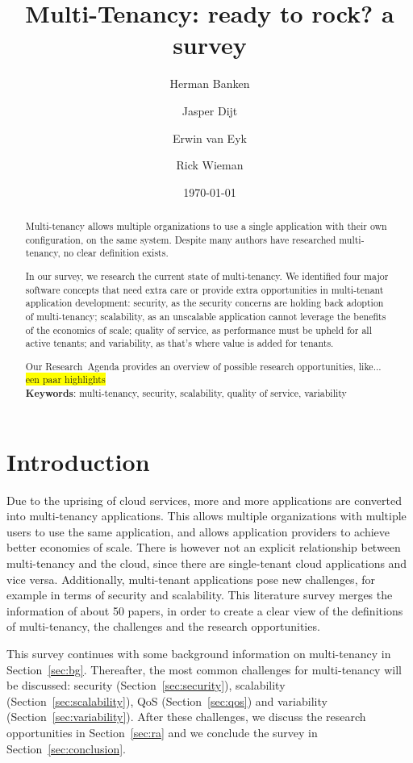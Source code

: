 \documentclass{article}
\title{Multi-Tenancy: ready to rock? a survey}
\author{Herman Banken\and
    Jasper Dijt\and
    Erwin van Eyk\and
    Rick Wieman}
\date{\today}
\newcommand{\highlight}[1]{\colorbox{yellow}{#1}}
\begin{document}
\maketitle
\thispagestyle{empty}

\begin{abstract}
Multi-tenancy allows multiple organizations to use a single application with their own configuration, on the same system. Despite many authors have researched multi-tenancy, no clear definition exists.

In our survey, we research the current state of multi-tenancy. We identified four major software concepts that need extra care or provide extra opportunities in multi-tenant application development: 
security, as the security concerns are holding back adoption of multi-tenancy; 
scalability, as an unscalable application cannot leverage the benefits of the economics of scale; 
quality of service, as performance must be upheld for all active tenants;
and variability, as that's where value is added for tenants.  

Our Research~Agenda provides an overview of possible research opportunities, 
like... \highlight{een paar highlights}%
\\

\textbf{Keywords}: multi-tenancy, security, scalability, quality of service, variability
\end{abstract}

\section{Introduction}
Due to the uprising of cloud services, more and more applications are converted into multi-tenancy applications. 
This allows multiple organizations with multiple users to use the same application, and allows application providers to achieve better economies of scale. 
There is however not an explicit relationship between multi-tenancy and the cloud, since there are single-tenant cloud applications and vice versa. 
Additionally, multi-tenant applications pose new challenges, for example in terms of security and scalability. 
This literature survey merges the information of about 50 papers, in order to create a clear view of the definitions of multi-tenancy, the challenges and the research opportunities.

This survey continues with some background information on multi-tenancy in Section~\ref{sec:bg}. Thereafter, the most common challenges for multi-tenancy will be discussed: security (Section~\ref{sec:security}), scalability (Section~\ref{sec:scalability}), \ac{QoS} (Section~\ref{sec:qos}) and variability (Section~\ref{sec:variability}). After these challenges, we discuss the research opportunities in Section~\ref{sec:ra} and we conclude the survey in Section~\ref{sec:conclusion}. %
\end{document}
